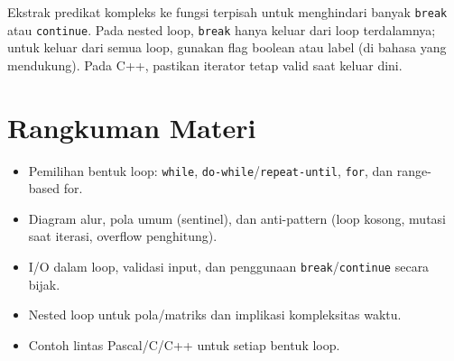 \documentclass[../main.tex]{subfiles}
\begin{document}
Ekstrak predikat kompleks ke fungsi terpisah untuk menghindari banyak \texttt{break} atau \texttt{continue}. Pada nested loop, \texttt{break} hanya keluar dari loop terdalamnya; untuk keluar dari semua loop, gunakan flag boolean atau label (di bahasa yang mendukung). Pada C++, pastikan iterator tetap valid saat keluar dini.
\section{Rangkuman Materi}
\begin{itemize}
  \item Pemilihan bentuk loop: \texttt{while}, \texttt{do-while}/\texttt{repeat-until}, \texttt{for}, dan range-based for.
  \item Diagram alur, pola umum (sentinel), dan anti-pattern (loop kosong, mutasi saat iterasi, overflow penghitung).
  \item I/O dalam loop, validasi input, dan penggunaan \texttt{break}/\texttt{continue} secara bijak.
  \item Nested loop untuk pola/matriks dan implikasi kompleksitas waktu.
  \item Contoh lintas Pascal/C/C++ untuk setiap bentuk loop.
\end{itemize}
\end{document}
